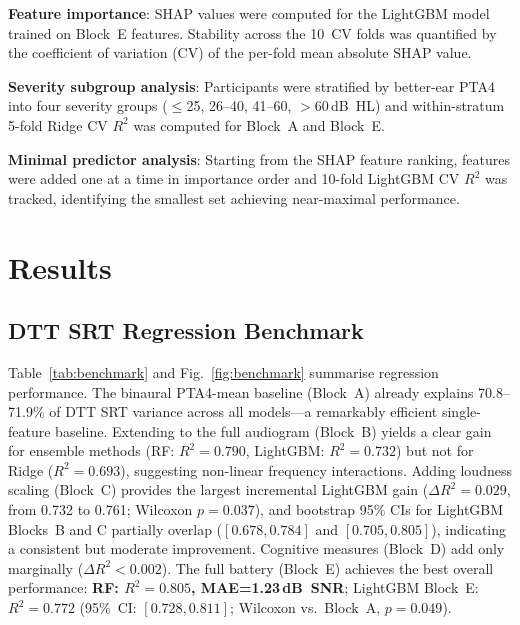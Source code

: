 \documentclass[12pt,a4paper]{article}
\begin{document}
\textbf{Feature importance}: SHAP values\cite{Lundberg2017SHAP} were
computed for the LightGBM model trained on Block~E features.  Stability
across the 10~CV folds was quantified by the coefficient of variation (CV)
of the per-fold mean absolute SHAP value.

\textbf{Severity subgroup analysis}: Participants were stratified by
better-ear PTA4 into four severity groups ($\leq$25, 26--40, 41--60,
$>$60\,dB~HL) and within-stratum 5-fold Ridge CV $R^2$ was computed for
Block~A and Block~E.

\textbf{Minimal predictor analysis}: Starting from the SHAP feature ranking,
features were added one at a time in importance order and 10-fold
LightGBM CV $R^2$ was tracked, identifying the smallest set achieving
near-maximal performance.

\section{Results}

\subsection{DTT SRT Regression Benchmark}

Table~\ref{tab:benchmark} and Fig.~\ref{fig:benchmark} summarise regression
performance.  The binaural PTA4-mean baseline (Block~A) already explains
70.8--71.9\% of DTT SRT variance across all models---a remarkably efficient
single-feature baseline.  Extending to the full audiogram (Block~B) yields
a clear gain for ensemble methods (RF: $R^2=0.790$, LightGBM: $R^2=0.732$)
but not for Ridge ($R^2=0.693$), suggesting non-linear frequency interactions.
Adding loudness scaling (Block~C) provides the largest incremental LightGBM
gain ($\Delta R^2 = 0.029$, from 0.732 to 0.761; Wilcoxon $p=0.037$),
and bootstrap 95\% CIs for LightGBM Blocks~B and C partially overlap
($[0.678, 0.784]$ and $[0.705, 0.805]$), indicating a consistent but
moderate improvement.  Cognitive measures (Block~D) add only marginally
($\Delta R^2 < 0.002$).  The full battery (Block~E) achieves the best
overall performance: \textbf{RF: $R^2=0.805$, MAE=1.23\,dB~SNR}; LightGBM
Block~E: $R^2=0.772$ (95\%~CI: $[0.728, 0.811]$; Wilcoxon vs.\ Block~A,
$p=0.049$).
\end{document}
